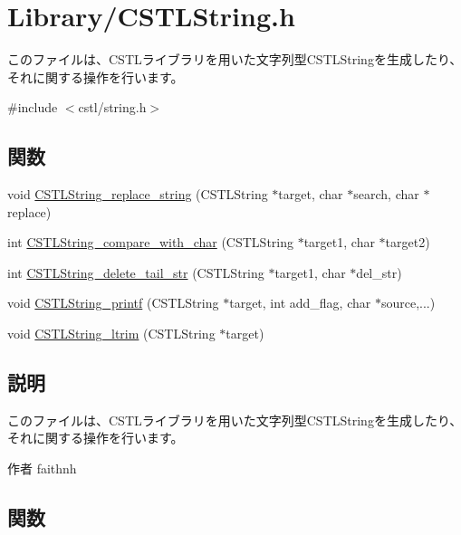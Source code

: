 \section{Library/CSTLString.h}
\label{CSTLString_8h}


このファイルは、CSTLライブラリを用いた文字列型CSTLStringを生成したり、それに関する操作を行います。  


{\ttfamily \#include $<$cstl/string.h$>$}\par
\subsection*{関数}
\begin{DoxyCompactItemize}
\item 
void \hyperlink{CSTLString_8h_a18e26d83587b82c192fdee06afe130ec}{CSTLString\_\-replace\_\-string} (CSTLString $\ast$target, char $\ast$search, char $\ast$replace)
\item 
int \hyperlink{CSTLString_8h_afc5ade5716a279fc0576b75f933b19a9}{CSTLString\_\-compare\_\-with\_\-char} (CSTLString $\ast$target1, char $\ast$target2)
\item 
int \hyperlink{CSTLString_8h_a1625e5156ceff6f2f505600d574757ae}{CSTLString\_\-delete\_\-tail\_\-str} (CSTLString $\ast$target1, char $\ast$del\_\-str)
\item 
void \hyperlink{CSTLString_8h_af2fe29138e25738a297f48a95dc741c6}{CSTLString\_\-printf} (CSTLString $\ast$target, int add\_\-flag, char $\ast$source,...)
\item 
void \hyperlink{CSTLString_8h_ad2c259b0d8fa85264f32cad8eaf05c00}{CSTLString\_\-ltrim} (CSTLString $\ast$target)
\end{DoxyCompactItemize}


\subsection{説明}
このファイルは、CSTLライブラリを用いた文字列型CSTLStringを生成したり、それに関する操作を行います。 \begin{DoxyAuthor}{作者}
faithnh 
\end{DoxyAuthor}


\subsection{関数}
